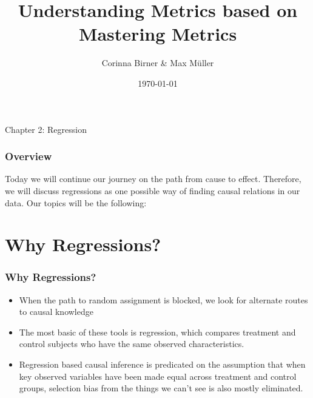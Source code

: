\documentclass{beamer}
\title[Mastering Metrics]{Understanding Metrics based on Mastering Metrics } %
\author{Corinna Birner \& Max M{\"u}ller} %
\institute[JMU] %
{University of W{\"u}rzburg }\\ %
\date{\today} %
\begin{document}
\begin{frame}
\titlepage %
\end{frame}

\begin{frame}
\begin{center}
\textbf\Huge{Chapter 2: Regression}
\end{center}
\end{frame}

\begin{frame}
\frametitle{Overview} %
Today we will continue our journey on the path from cause to effect. Therefore, we will discuss regressions as one possible way of finding causal relations in our data. Our topics will be the following:

\tableofcontents %
\end{frame}


\section{Why Regressions?}

\begin{frame}
\frametitle{Why Regressions?}
\begin{itemize}
	\item When the path to random assignment is blocked, we look for alternate routes to causal knowledge
	\item The most basic of these tools is regression, which compares treatment and control subjects who have the same observed characteristics.
	\item Regression based causal inference is predicated on the assumption that when key observed variables have been made equal across treatment and control groups, selection bias from the things we can’t see is also mostly eliminated.
\end{itemize}
\end{frame}
\end{document}
